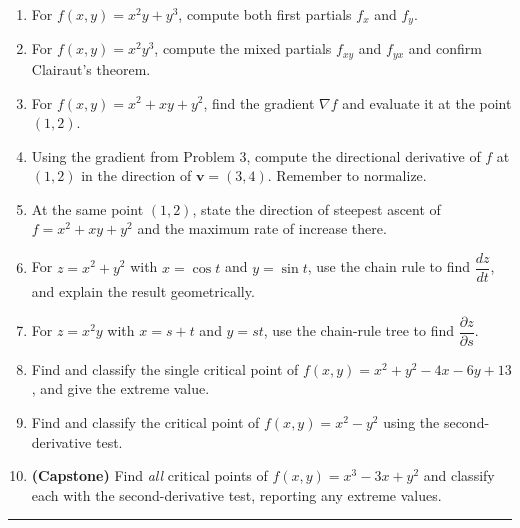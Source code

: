 \begin{enumerate}[leftmargin=2em]
    \item For $f(x,y) = x^2 y + y^3$, compute both first partials $f_x$ and
          $f_y$.

    \item For $f(x,y) = x^2 y^3$, compute the mixed partials $f_{xy}$ and
          $f_{yx}$ and confirm Clairaut's theorem.

    \item For $f(x,y) = x^2 + xy + y^2$, find the gradient $\nabla f$ and
          evaluate it at the point $(1,2)$.

    \item Using the gradient from Problem 3, compute the directional derivative of
          $f$ at $(1,2)$ in the direction of $\mathbf v = (3,4)$. Remember to
          normalize.

    \item At the same point $(1,2)$, state the direction of steepest ascent of
          $f=x^2+xy+y^2$ and the maximum rate of increase there.

    \item For $z = x^2 + y^2$ with $x = \cos t$ and $y = \sin t$, use the chain
          rule to find $\dfrac{dz}{dt}$, and explain the result geometrically.

    \item For $z = x^2 y$ with $x = s + t$ and $y = st$, use the chain-rule tree
          to find $\dfrac{\partial z}{\partial s}$.

    \item Find and classify the single critical point of
          $f(x,y) = x^2 + y^2 - 4x - 6y + 13$, and give the extreme value.

    \item Find and classify the critical point of $f(x,y) = x^2 - y^2$ using the
          second-derivative test.

    \item \textbf{(Capstone)} Find \emph{all} critical points of
          $f(x,y) = x^3 - 3x + y^2$ and classify each with the second-derivative
          test, reporting any extreme values.
\end{enumerate}

\vspace{0.4em}
\hrule
\vspace{0.6em}

\clearpage
{}
{}
